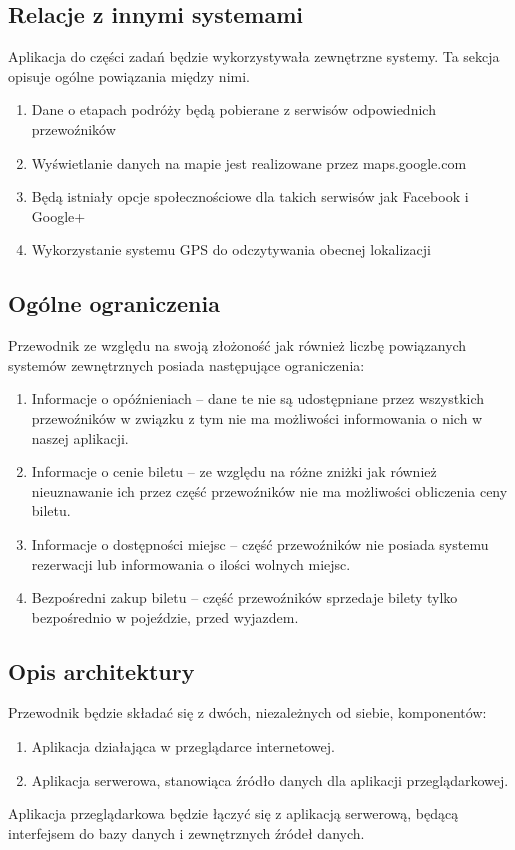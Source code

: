 \documentclass[12pt,a4paper]{report}
\begin{document}
\subsection{Relacje z innymi systemami}
	Aplikacja do części zadań będzie wykorzystywała zewnętrzne systemy. Ta sekcja opisuje ogólne powiązania między nimi.
\begin{enumerate}
	\item Dane o etapach podróży będą pobierane z serwisów odpowiednich przewoźników
	\item Wyświetlanie danych na mapie jest realizowane przez maps.google.com
	\item Będą istniały opcje społecznościowe dla takich serwisów jak Facebook i Google+
	\item Wykorzystanie systemu GPS do odczytywania obecnej lokalizacji
\end{enumerate}
\newpage
\subsection{Ogólne ograniczenia}
	Przewodnik ze względu na swoją złożoność jak również liczbę powiązanych systemów zewnętrznych posiada następujące ograniczenia:	
\begin{enumerate}
	\item Informacje o opóźnieniach -- dane te nie są udostępniane przez wszystkich przewoźników w związku z tym nie ma możliwości informowania o nich w naszej aplikacji.
	\item Informacje o cenie biletu -- ze względu na różne zniżki jak również nieuznawanie ich przez część przewoźników nie ma możliwości obliczenia ceny biletu.
	\item Informacje o dostępności miejsc -- część przewoźników nie posiada systemu rezerwacji lub informowania o ilości wolnych miejsc.
	\item Bezpośredni zakup biletu -- część przewoźników sprzedaje bilety tylko bezpośrednio w pojeździe, przed wyjazdem.
\end{enumerate}
\subsection{Opis architektury}
Przewodnik będzie składać się z dwóch, niezależnych od siebie, komponentów:
\begin{enumerate}
	\item Aplikacja działająca w przeglądarce internetowej.
	\item Aplikacja serwerowa, stanowiąca źródło danych dla aplikacji przeglądarkowej.
\end{enumerate} 
	Aplikacja przeglądarkowa będzie łączyć się z aplikacją serwerową, będącą interfejsem do bazy danych i zewnętrznych źródeł danych.
\end{document}
